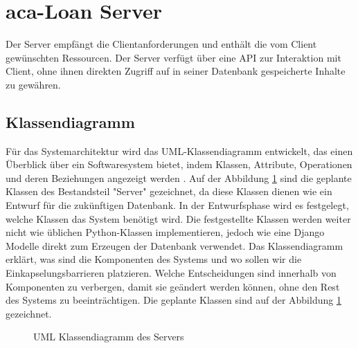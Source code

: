 \section{aca-Loan Server}
Der Server empfängt die Clientanforderungen und enthält die vom Client gewünschten Ressourcen. Der Server verfügt über eine API zur Interaktion mit Client, ohne ihnen direkten Zugriff auf in seiner Datenbank gespeicherte Inhalte zu gewähren.
\subsection{Klassendiagramm}
\label{sec:design:uml:class}
Für das Systemarchitektur wird das UML-Klassendiagramm entwickelt, das einen Überblick über ein Softwaresystem bietet, indem Klassen, Attribute, Operationen und deren Beziehungen angezeigt werden \cite{website:19}. Auf der Abbildung \ref{fig:class} sind die geplante Klassen des Bestandsteil "Server" gezeichnet, da diese Klassen dienen wie ein Entwurf für die zukünftigen Datenbank. In der Entwurfsphase wird es festgelegt, welche Klassen das System benötigt wird. Die festgestellte Klassen werden weiter nicht wie üblichen Python-Klassen implementieren, jedoch wie eine Django Modelle direkt zum Erzeugen der Datenbank verwendet. Das Klassendiagramm erklärt, was sind die Komponenten des Systems und wo sollen wir die Einkapselungsbarrieren platzieren. Welche Entscheidungen sind innerhalb von Komponenten zu verbergen, damit sie geändert werden können, ohne den Rest des Systems zu beeinträchtigen. Die geplante Klassen sind auf der Abbildung \ref{fig:class} gezeichnet.
\begin{figure}[h!]
	\centering
	\caption{UML Klassendiagramm des Servers}
	\label{fig:class}
\end{figure}

